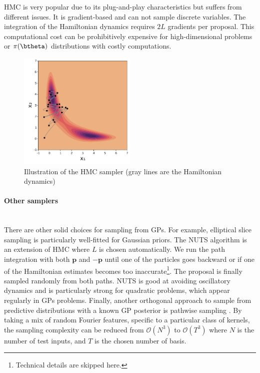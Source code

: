 \ac{HMC} is very popular due to its plug-and-play characteristics but suffers from different issues.
It is gradient-based and can not sample discrete variables.
The integration of the Hamiltonian dynamics requires $2L$ gradients per proposal.
This computational cost can be prohibitively expensive for high-dimensional problems or $\pi(\btheta)$ distributions with costly computations.

\begin{figure}[H]
    \centering
\includegraphics[width=0.5\textwidth]{./chapters/2_background/figures/hmc_sampling.pdf}
\caption{Illustration of the HMC sampler (gray lines are the Hamiltonian dynamics)}
\label{fig:hmc}
\end{figure}


\paragraph{Other samplers}\mbox{}\\
There are other solid choices for sampling from \acp{GP}.
For example, elliptical slice sampling \citet{murray2010elliptical} is particularly well-fitted for Gaussian priors.
The \ac{NUTS} algorithm \cite{hoffman2014no} is an extension of \ac{HMC} where $L$ is chosen automatically.
We run the path integration with both $\boldsymbol{p}$ and $-\boldsymbol{p}$ until one of the particles goes backward or if one of the Hamiltonian estimates becomes too inaccurate\footnote{Technical details are skipped here.}.
The proposal is finally sampled randomly from both paths.
\ac{NUTS} is good at avoiding oscillatory dynamics and is particularly strong for quadratic problems, which appear regularly in \acp{GP} problems.
Finally, another orthogonal approach to sample from predictive distributions with a known \ac{GP} posterior is pathwise sampling \cite{wilson2021pathwise}.
By taking a mix of random Fourier features, specific to a particular class of kernels, the sampling complexity can be reduced from $\mathcal{O}(N^3)$ to $\mathcal{O}(T^3)$ where $N$ is the number of test inputs, and $T$ is the chosen number of basis.

